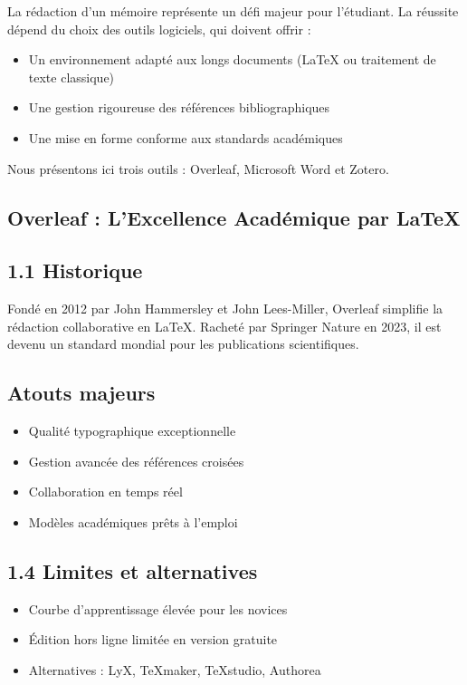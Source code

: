 \documentclass[12pt]{article}
\begin{document}
\begin{center}
La rédaction d'un mémoire représente un défi majeur pour l'étudiant. La réussite dépend du choix des outils logiciels, qui doivent offrir :
\begin{itemize}[leftmargin=*, label=\textbullet]
    \item Un environnement adapté aux longs documents (LaTeX ou traitement de texte classique)
    \item Une gestion rigoureuse des références bibliographiques
    \item Une mise en forme conforme aux standards académiques
\end{itemize}
Nous présentons ici trois outils : Overleaf, Microsoft Word et Zotero.

\subsection*{ Overleaf : L'Excellence Académique par LaTeX}
\subsection*{1.1 Historique}
Fondé en 2012 par John Hammersley et John Lees-Miller, Overleaf simplifie la rédaction collaborative en LaTeX. Racheté par Springer Nature en 2023, il est devenu un standard mondial pour les publications scientifiques.


\subsection{Atouts majeurs}
\begin{itemize}[leftmargin=*, label=\textbullet]
    \item Qualité typographique exceptionnelle
    \item Gestion avancée des références croisées
    \item Collaboration en temps réel
    \item Modèles académiques prêts à l'emploi
\end{itemize}

\subsection*{1.4 Limites et alternatives}
\begin{itemize}[leftmargin=*, label=\textbullet]
    \item Courbe d'apprentissage élevée pour les novices
    \item Édition hors ligne limitée en version gratuite
    \item Alternatives : LyX, TeXmaker, TeXstudio, Authorea
\end{itemize}


\end{center}
\end{document}

